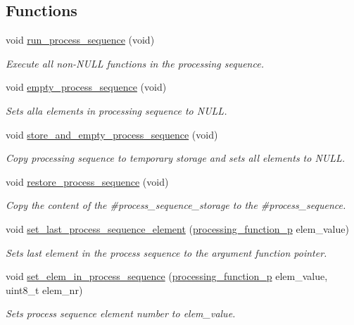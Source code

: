 \subsection*{\-Functions}
\begin{DoxyCompactItemize}
\item 
void \hyperlink{group__proc__sequence_ga9cdcede43262de22e0dae58805e2c9c0}{run\-\_\-process\-\_\-sequence} (void)
\begin{DoxyCompactList}\small\item\em \-Execute all non-\/\-N\-U\-L\-L functions in the processing sequence. \end{DoxyCompactList}\item 
void \hyperlink{group__proc__sequence_ga1411bde99978e76b94f77665c370e6f4}{empty\-\_\-process\-\_\-sequence} (void)
\begin{DoxyCompactList}\small\item\em \-Sets alla elements in processing sequence to \-N\-U\-L\-L. \end{DoxyCompactList}\item 
void \hyperlink{group__proc__sequence_gaaca35dad858ccdc82751cfd34d4535a6}{store\-\_\-and\-\_\-empty\-\_\-process\-\_\-sequence} (void)
\begin{DoxyCompactList}\small\item\em \-Copy processing sequence to temporary storage and sets all elements to \-N\-U\-L\-L. \end{DoxyCompactList}\item 
void \hyperlink{group__proc__sequence_gaa734084dcdd99e68958aa61e0ed4c1bc}{restore\-\_\-process\-\_\-sequence} (void)
\begin{DoxyCompactList}\small\item\em \-Copy the content of the \#process\-\_\-sequence\-\_\-storage to the \#process\-\_\-sequence. \end{DoxyCompactList}\item 
void \hyperlink{group__proc__sequence_ga8839f3427b43cb0e9c707ec27dfb46d3}{set\-\_\-last\-\_\-process\-\_\-sequence\-\_\-element} (\hyperlink{group__proc__sequence_ga5fcb98b03e729c4ec685656d28ba37e2}{processing\-\_\-function\-\_\-p} elem\-\_\-value)
\begin{DoxyCompactList}\small\item\em \-Sets last element in the process sequence to the argument function pointer. \end{DoxyCompactList}\item 
void \hyperlink{group__proc__sequence_gad6e1709729ab982734163a29b20bcc70}{set\-\_\-elem\-\_\-in\-\_\-process\-\_\-sequence} (\hyperlink{group__proc__sequence_ga5fcb98b03e729c4ec685656d28ba37e2}{processing\-\_\-function\-\_\-p} elem\-\_\-value, uint8\-\_\-t elem\-\_\-nr)
\begin{DoxyCompactList}\small\item\em \-Sets process sequence element number to elem\-\_\-value. \end{DoxyCompactList}\end{DoxyCompactItemize}


